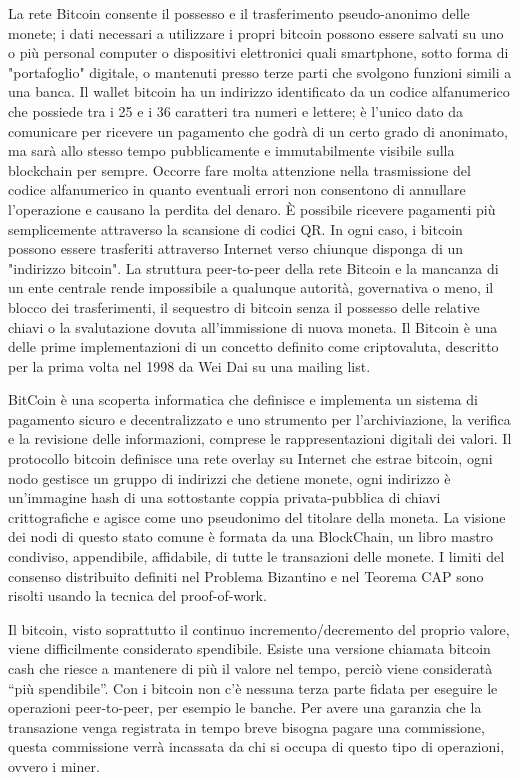 \singlespacing

La rete Bitcoin consente il possesso e il trasferimento pseudo-anonimo delle monete; i dati necessari a utilizzare
i propri bitcoin possono essere salvati su uno o più personal computer o dispositivi elettronici quali smartphone,
sotto forma di "portafoglio" digitale, o mantenuti presso terze parti che svolgono funzioni simili a una banca. Il
wallet bitcoin ha un indirizzo identificato da un codice alfanumerico che possiede tra i 25 e i 36 caratteri tra
numeri e lettere; è l'unico dato da comunicare per ricevere un pagamento che godrà di un certo grado di
anonimato, ma sarà allo stesso tempo pubblicamente e immutabilmente visibile sulla blockchain per sempre.
Occorre fare molta attenzione nella trasmissione del codice alfanumerico in quanto eventuali errori non consentono
di annullare l'operazione e causano la perdita del denaro. È possibile ricevere pagamenti più semplicemente
attraverso la scansione di codici QR. In ogni caso, i bitcoin possono essere trasferiti attraverso Internet verso
chiunque disponga di un "indirizzo bitcoin". La struttura peer-to-peer della rete Bitcoin e la mancanza di un ente
centrale rende impossibile a qualunque autorità, governativa o meno, il blocco dei trasferimenti, il sequestro di
bitcoin senza il possesso delle relative chiavi o la svalutazione dovuta all'immissione di nuova moneta.
Il Bitcoin è una delle prime implementazioni di un concetto definito come criptovaluta, descritto per la prima volta
nel 1998 da Wei Dai su una mailing list.

\singlespacing

BitCoin è una scoperta informatica che definisce e implementa un sistema di pagamento sicuro e
decentralizzato e uno strumento per l'archiviazione, la verifica e la revisione delle informazioni, comprese le
rappresentazioni digitali dei valori.
Il protocollo bitcoin definisce una rete overlay su Internet che estrae bitcoin, ogni nodo gestisce un gruppo di
indirizzi che detiene monete, ogni indirizzo è un'immagine hash di una sottostante coppia privata-pubblica
di chiavi crittografiche e agisce come uno pseudonimo del titolare della moneta.
La visione dei nodi di questo stato comune è formata da una BlockChain, un libro mastro condiviso, appendibile,
affidabile, di tutte le transazioni delle monete. I limiti del consenso distribuito definiti nel Problema Bizantino e nel
Teorema CAP sono risolti usando la tecnica del proof-of-work.

\singlespacing

Il bitcoin, visto soprattutto il continuo incremento/decremento del proprio valore, viene difficilmente considerato
spendibile. Esiste una versione chiamata bitcoin cash che riesce a mantenere di più il valore nel tempo, perciò
viene consideratà “più spendibile”.
Con i bitcoin non c’è nessuna terza parte fidata per eseguire le operazioni peer-to-peer, per esempio le banche.
Per avere una garanzia che la transazione venga registrata in tempo breve bisogna pagare una commissione,
questa commissione verrà incassata da chi si occupa di questo tipo di operazioni, ovvero i miner.
